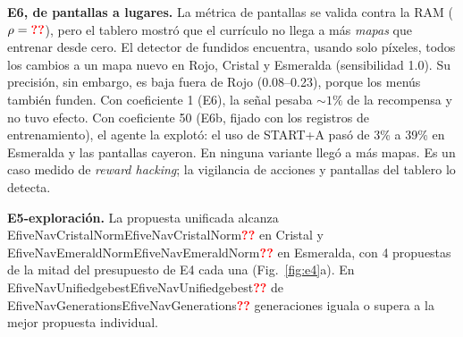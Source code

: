 \documentclass[conference]{IEEEtran}
\newcommand{\val}[1]{\ifcsname #1\endcsname\csname #1\endcsname\else\textbf{\textcolor{red}{??}}\fi}
\begin{document}
\textbf{E6, de pantallas a lugares.} La métrica de pantallas se valida contra la RAM ($\rho=\val{EthreeRho}$), pero el tablero mostró que el currículo no llega a más \emph{mapas} que entrenar desde cero. El detector de fundidos encuentra, usando solo píxeles, todos los cambios a un mapa nuevo en Rojo, Cristal y Esmeralda (sensibilidad 1.0). Su precisión, sin embargo, es baja fuera de Rojo (0.08--0.23), porque los menús también funden. Con coeficiente 1 (E6), la señal pesaba ${\sim}1\%$ de la recompensa y no tuvo efecto. Con coeficiente 50 (E6b, fijado con los registros de entrenamiento), el agente la explotó: el uso de START+A pasó de 3\% a 39\% en Esmeralda y las pantallas cayeron. En ninguna variante llegó a más mapas. Es un caso medido de \emph{reward hacking}; la vigilancia de acciones y pantallas del tablero lo detecta.

\textbf{E5-exploración.} La propuesta unificada alcanza \val{EfiveNavCristalNorm} en Cristal y \val{EfiveNavEmeraldNorm} en Esmeralda, con 4 propuestas de la mitad del presupuesto de E4 cada una (Fig.~\ref{fig:e4}a). En \val{EfiveNavUnifiedgebest} de \val{EfiveNavGenerations} generaciones iguala o supera a la mejor propuesta individual.
\end{document}
